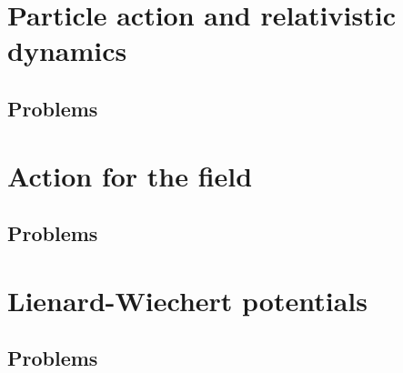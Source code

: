    \chapter{Particle action and relativistic dynamics}
      
      
      
      
      
      
      
      \section{Problems}
         

   \chapter{Action for the field}
      
      
      
      
      
      
      \section{Problems}
         
         

   \chapter{Lienard-Wiechert potentials}
      
      
      
      
      
      \section{Problems}
         
         

